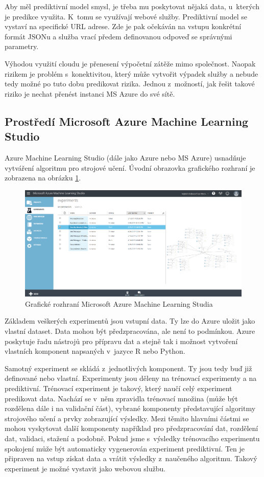 \documentclass[thesis=M,czech]{FITthesis}[2012/10/20]
\newcommand{\tmpframe}[1]{\fbox{#1}}
\renewcommand{\tmpframe}[1]{#1}
\begin{document}
		Aby měl prediktivní model smysl, je třeba mu poskytovat nějaká data, u~kterých je predikce využita. K~tomu se využívají webové služby.
		Prediktivní model se vystaví na specifické URL adrese. Zde je pak očekáván na vstupu konkrétní formát JSONu a služba vrací předem definovanou odpoveď se správnými parametry.
		
		Výhodou využití cloudu je přenesení výpočetní zátěže mimo společnost. Naopak rizikem je problém s~konektivitou, který může vytvořit výpadek služby a nebude tedy možné po tuto dobu predikovat rizika. Jednou z~možností, jak řešit takové riziko je nechat přenést instanci MS Azure do své sítě.
		
		\subsection{Prostředí Microsoft Azure Machine Learning Studio}
			Azure Machine Learning Studio (dále jako Azure nebo MS Azure) usnadňuje vytváření algoritmu pro strojové učení. Úvodní obrazovka grafického rozhraní je zobrazena na obrázku \ref{fig:MSAzureML}.
			
			\begin{figure}[htb]\centering
				\tmpframe{\includegraphics[width=\textwidth]{./img/MSAzureML}}		
				\caption{Grafické rozhraní Microsoft Azure Machine Learning Studia}
				\label{fig:MSAzureML}
			\end{figure}
			
			Základem veškerých experimentů jsou vstupní data. Ty lze do Azure uložit jako vlastní dataset. Data mohou být předzpracována, ale není to podmínkou. Azure poskytuje řadu nástrojů pro přípravu dat a stejně tak i možnost vytvoření vlastních komponent napsaných v~jazyce R nebo Python.
			
			Samotný experiment se skládá z~jednotlivých komponent. Ty jsou tedy buď již definované nebo vlastní. Experimenty jsou děleny na trénovací experimenty a na prediktivní. Trénovací experiment je takový, který naučí celý experiment predikovat data. Nachází se v~něm zpravidla trénovací množina (může být rozdělena dále i na validační část), vybrané komponenty představující algoritmy strojového učení a prvky zobrazující výsledky. Mezi těmito hlavními částmi se mohou vyskytovat další komponenty například pro předzpracování dat, rozdělení dat, validaci, stažení a podobně. Pokud jsme s~výsledky trénovacího experimentu spokojení může být automaticky vygenerován experiment prediktivní. Ten je připraven na vstup získat data a vrátit výsledky z~naučeného algoritmu. Takový experiment je možné vystavit jako webovou službu.
			
\end{document}
